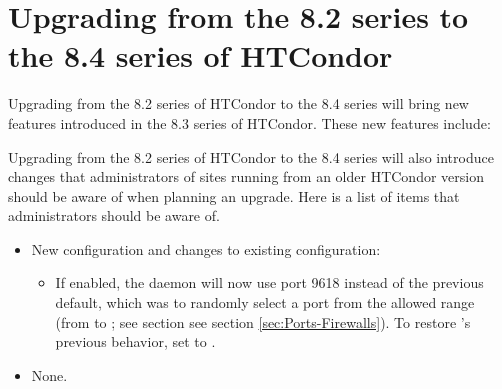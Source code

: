 \section{\label{sec:to-8.4}Upgrading from the 8.2 series to the 8.4 series of HTCondor}

Upgrading from the 8.2 series of HTCondor to the 8.4 series 
will bring new features introduced in the 8.3 series of HTCondor.
These new features include:
\MoreTodo

Upgrading from the 8.2 series of HTCondor to the 8.4 series will
also introduce changes that administrators of sites running from an older
HTCondor version should be aware of when planning an upgrade.  
Here is a list of items that administrators should be aware of.

\begin{itemize}

\item New configuration and changes to existing configuration:
  \begin{itemize}

\item If enabled, the  daemon will now use port 9618
instead of the previous default, which was to randomly select a port from
the allowed range (from  to ; see section
see section \ref{sec:Ports-Firewalls}).  To restore 's
previous behavior, set  to .

  \end{itemize}

\item None.

\end{itemize}


